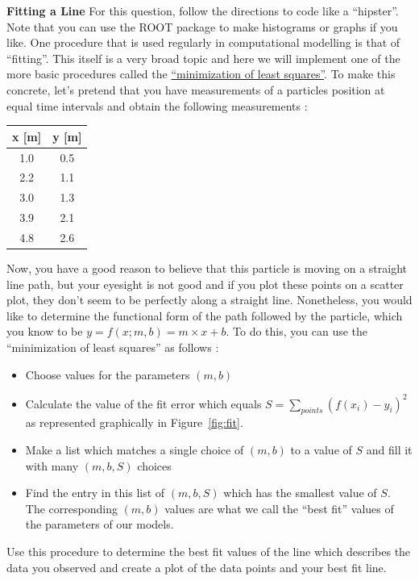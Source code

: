 \documentclass[12pt]{article}
\begin{document}
\newpage
\textbf{Fitting a Line} 
\newline
For this question, follow the directions to code like a ``hipster''.  Note that you can use the ROOT package to make histograms or graphs if you like.
\newline
\newline
One procedure that is used regularly in computational modelling is that of ``fitting''.  This itself is a very broad topic and here we will implement one of the more basic procedures called the \href{https://en.wikipedia.org/wiki/Least_squares}{``minimization of least squares''}.  To make this concrete, let's pretend that you have measurements of a particles position at equal time intervals and obtain the following measurements :
\begin{center}
\begin{tabular}{ c|c } 
 x [m] & y [m] \\ \hline
 1.0 & 0.5 \\ 
 2.2 & 1.1 \\ 
 3.0 & 1.3 \\
 3.9 & 2.1 \\
 4.8 & 2.6 \\
\end{tabular}
\end{center}
Now, you have a good reason to believe that this particle is moving on a straight line path, but your eyesight is not good and if you plot these points on a scatter plot, they don't seem to be perfectly along a straight line.  Nonetheless, you would like to determine the functional form of the path followed by the particle, which you know to be $y=f(x;m,b)=m\times x+b$.  To do this, you can use the ``minimization of least squares'' as follows :
\begin{itemize}
\item Choose values for the parameters $(m,b)$
\item Calculate the value of the fit error which equals $S=\displaystyle\sum_{points} (f(x_{i})-y_{i})^{2}$ as represented graphically in Figure~\ref{fig:fit}.
\item Make a list which matches a single choice of $(m,b)$ to a value of $S$ and fill it with many $(m,b,S)$ choices
\item Find the entry in this list of $(m,b,S)$ which has the smallest value of $S$.  The corresponding $(m,b)$ values are what we call the ``best fit'' values of the parameters of our models.
\end{itemize}
Use this procedure to determine the best fit values of the line which describes the data you observed and create a plot of the data points and your best fit line.
\end{document}
